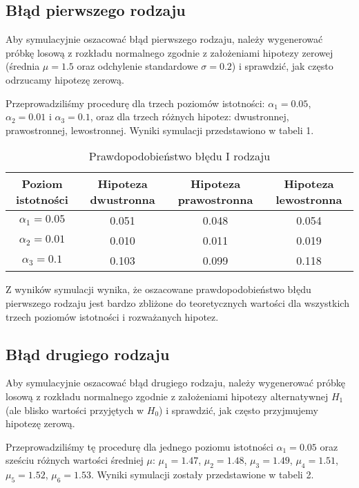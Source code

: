 \documentclass[12pt,letterpaper]{article}
\theoremstyle{definition}
\begin{document}
{{\subsection{Błąd pierwszego rodzaju}
 Aby symulacyjnie oszacować błąd pierwszego rodzaju, należy wygenerować próbkę losową z rozkładu normalnego zgodnie z założeniami hipotezy zerowej (średnia $\mu = 1.5$ oraz odchylenie standardowe $\sigma = 0.2$) i sprawdzić, jak często odrzucamy hipotezę zerową.

Przeprowadziliśmy procedurę dla trzech poziomów istotności: $\alpha_1 = 0.05$, $\alpha_2 = 0.01$ i $\alpha_3 = 0.1$, oraz dla trzech różnych hipotez: dwustronnej, prawostronnej, lewostronnej. Wyniki symulacji przedstawiono w tabeli 1.

\newpage
\begin{table}[h!]
    \centering
    \caption{Prawdopodobieństwo błędu I rodzaju}
    \begin{tabular}{cccc}
        \toprule
        Poziom istotności & Hipoteza dwustronna & Hipoteza prawostronna & Hipoteza lewostronna \\
        \midrule
        $\alpha_1 = 0.05$ & 0.051 & 0.048 & 0.054 \\
        $\alpha_2 = 0.01$ & 0.010 & 0.011 & 0.019 \\
        $\alpha_3 = 0.1$ & 0.103 & 0.099 & 0.118 \\
        \bottomrule
    \end{tabular}
\end{table}

Z wyników symulacji wynika, że oszacowane prawdopodobieństwo błędu pierwszego rodzaju jest bardzo zbliżone do teoretycznych wartości dla wszystkich trzech poziomów istotności i rozważanych hipotez. 

\subsection{Błąd drugiego rodzaju}
Aby symulacyjnie oszacować błąd drugiego rodzaju, należy wygenerować próbkę losową z rozkładu normalnego zgodnie z założeniami hipotezy alternatywnej \(H_1\) (ale blisko wartości przyjętych w \(H_0\)) i sprawdzić, jak często przyjmujemy hipotezę zerową.

Przeprowadziliśmy tę procedurę dla jednego poziomu istotności $\alpha_1 = 0.05$ oraz sześciu różnych wartości średniej $\mu$: $\mu_1 = 1.47$, $\mu_2 = 1.48$, $\mu_3 = 1.49$, $\mu_4 = 1.51$, $\mu_5 = 1.52$, $\mu_6 = 1.53$. Wyniki symulacji zostały przedstawione w tabeli 2.

}}
\end{document}

